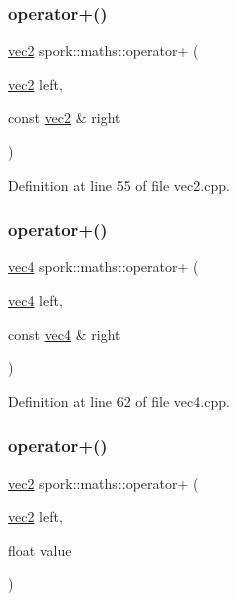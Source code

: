 \subsubsection{\texorpdfstring{operator+()}{operator+()}\hspace{0.1cm}{\footnotesize\ttfamily [1/5]}}
{\footnotesize\ttfamily \hyperlink{structspork_1_1maths_1_1vec2}{vec2} spork\+::maths\+::operator+ (\begin{DoxyParamCaption}\item[{\hyperlink{structspork_1_1maths_1_1vec2}{vec2}}]{left,  }\item[{const \hyperlink{structspork_1_1maths_1_1vec2}{vec2} \&}]{right }\end{DoxyParamCaption})}



Definition at line 55 of file vec2.\+cpp.

\mbox{\label{namespacespork_1_1maths_a7bfe9cc91f2ee3e20fe59c44cb8a7dce}} 
\subsubsection{\texorpdfstring{operator+()}{operator+()}\hspace{0.1cm}{\footnotesize\ttfamily [2/5]}}
{\footnotesize\ttfamily \hyperlink{structspork_1_1maths_1_1vec4}{vec4} spork\+::maths\+::operator+ (\begin{DoxyParamCaption}\item[{\hyperlink{structspork_1_1maths_1_1vec4}{vec4}}]{left,  }\item[{const \hyperlink{structspork_1_1maths_1_1vec4}{vec4} \&}]{right }\end{DoxyParamCaption})}



Definition at line 62 of file vec4.\+cpp.

\mbox{\label{namespacespork_1_1maths_abca6a1c7a99727069e27bfa8db3421f1}} 
\subsubsection{\texorpdfstring{operator+()}{operator+()}\hspace{0.1cm}{\footnotesize\ttfamily [3/5]}}
{\footnotesize\ttfamily \hyperlink{structspork_1_1maths_1_1vec2}{vec2} spork\+::maths\+::operator+ (\begin{DoxyParamCaption}\item[{\hyperlink{structspork_1_1maths_1_1vec2}{vec2}}]{left,  }\item[{float}]{value }\end{DoxyParamCaption})}



